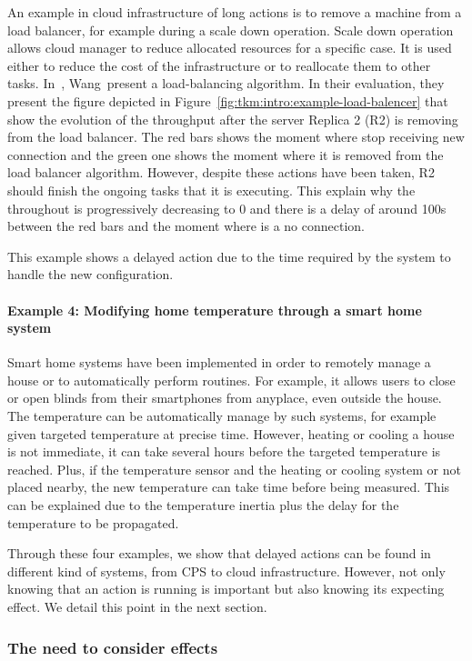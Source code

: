 An example in cloud infrastructure of long actions is to remove a machine from a load balancer, for example during a scale down operation.
Scale down operation allows cloud manager to reduce allocated resources for a specific case.
It is used either to reduce the cost of the infrastructure or to reallocate them to other tasks.
In~\cite{DBLP:conf/nsdi/WangBR11}, Wang~\etal present a load-balancing algorithm.
In their evaluation, they present the figure depicted in Figure~\ref{fig:tkm:intro:example-load-balencer} that show the evolution of the throughput after the server Replica 2 (R2) is removing from the load balancer.
The red bars shows the moment where stop receiving new connection and the green one shows the moment where it is removed from the load balancer algorithm.
However, despite these actions have been taken, R2 should finish the ongoing tasks that it is executing.
This explain why the throughout is progressively decreasing to 0 and there is a delay of around 100s between the red bars and the moment where is a no connection.

This example shows a delayed action due to the time required by the system to handle the new configuration.

\paragraph{Example 4: Modifying home temperature through a smart home system}
Smart home systems have been implemented in order to remotely manage a house or to automatically perform routines.
For example, it allows users to close or open blinds from their smartphones from anyplace, even outside the house.
The temperature can be automatically manage by such systems, for example given targeted temperature at precise time.
However, heating or cooling a house is not immediate, it can take several hours before the targeted temperature is reached.
Plus, if the temperature sensor and the heating or cooling system or not placed nearby, the new temperature can take time before being measured.
This can be explained due to the temperature inertia plus the delay for the temperature to be propagated.


Through these four examples, we show that delayed actions can be found in different kind of systems, from CPS to cloud infrastructure.
However, not only knowing that an action is running is important but also knowing its expecting effect.
We detail this point in the next section.

\subsubsection{The need to consider effects}
\label{sec:tkm:intro:motivation:dact:consider-effects}

